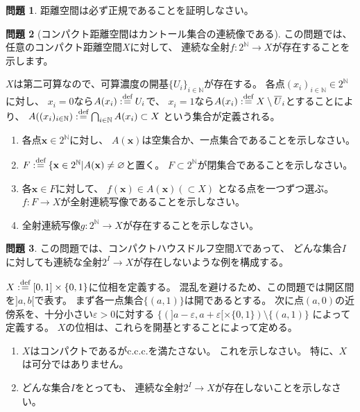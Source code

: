 \documentclass[uplatex]{jsarticle}
\theoremstyle{definition}
\newtheorem{prob}[prob]{問題}
\renewcommand{\emptyset}{\varnothing}
\newcommand{\ep}{\varepsilon}
\newcommand{\dfn}{:\overset{\mbox{{\scriptsize def}}}{=}}
\newcommand{\N}{\mathbb{N}}
\begin{document}
\begin{prob}
  距離空間は必ず正規であることを証明しなさい。
\end{prob}




\begin{prob}[コンパクト距離空間はカントール集合の連続像である]
  この問題では、任意のコンパクト距離空間\(X\)に対して、
  連続な全射\(f:2^{\N}\to X\)が存在することを示します。

  \(X\)は第二可算なので、可算濃度の開基\(\{U_i\}_{i\in \N}\)が存在する。
  各点\((x_i)_{i\in \N}\in 2^{\N}\)に対し、
  \(x_i = 0\)なら\(A(x_i)\dfn U_i\)で、
  \(x_i = 1\)なら\(A(x_i)\dfn X\setminus \overline{U}_i\)とすることにより、
  \(A((x_i)_{i\in \N}) \dfn \bigcap_{i\in \N}A(x_i)\subset X\)
  という集合が定義される。
  \begin{enumerate}
    \item
    各点\(\mathbf{x}\in 2^{\N}\)に対し、
    \(A(\mathbf{x})\)は空集合か、一点集合であることを示しなさい。
    \item
    \(F\dfn \{\mathbf{x}\in 2^{\N} | A(\mathbf{x})\neq \emptyset\)と置く。
    \(F\subset 2^{\N}\)が閉集合であることを示しなさい。
    \item
    各\(\mathbf{x}\in F\)に対して、
    \(f(\mathbf{x})\in A(\mathbf{x}) (\subset X)\)
    となる点を一つずつ選ぶ。
    \(f:F\to X\)が全射連続写像であることを示しなさい。
    \item
    全射連続写像\(g:2^{\N}\to X\)が存在することを示しなさい。
  \end{enumerate}
\end{prob}



\begin{prob}\label{cpt but not ccc}
  この問題では、コンパクトハウスドルフ空間\(X\)であって、
  どんな集合\(I\)に対しても連続な全射\(2^I\to X\)が存在しないような例を構成する。

  \(X\dfn [0,1]\times \{0,1\}\)に位相を定義する。
  混乱を避けるため、この問題では開区間を\(]a,b[\)で表す。
  まず各一点集合\(\{(a,1)\}\)は開であるとする。
  次に点\((a,0)\)の近傍系を、十分小さい\(\ep > 0\)に対する
  \(\{ (]a-\ep,a+\ep[ \times \{0,1\}) \setminus \{(a,1)\}\)
  によって定義する。
  \(X\)の位相は、これらを開基とすることによって定める。
  \begin{enumerate}
    \item
    \(X\)はコンパクトであるがc.c.c.を満たさない。
    これを示しなさい。
    特に、\(X\)は可分ではありません。
    \item
    どんな集合\(I\)をとっても、
    連続な全射\(2^I\to X\)が存在しないことを示しなさい。
  \end{enumerate}
\end{prob}
\end{document}
